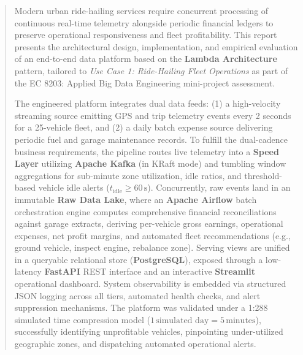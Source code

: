 \documentclass[11pt,a4paper]{article}
\begin{document}
\setcounter{page}{2}

\begin{abstract}
\noindent Modern urban ride-hailing services require concurrent processing of continuous real-time telemetry alongside periodic financial ledgers to preserve operational responsiveness and fleet profitability. This report presents the architectural design, implementation, and empirical evaluation of an end-to-end data platform based on the \textbf{Lambda Architecture} pattern, tailored to \textit{Use Case 1: Ride-Hailing Fleet Operations} as part of the EC 8203: Applied Big Data Engineering mini-project assessment.

The engineered platform integrates dual data feeds: (1) a high-velocity streaming source emitting GPS and trip telemetry events every 2 seconds for a 25-vehicle fleet, and (2) a daily batch expense source delivering periodic fuel and garage maintenance records. To fulfill the dual-cadence business requirements, the pipeline routes live telemetry into a \textbf{Speed Layer} utilizing \textbf{Apache Kafka} (in KRaft mode) and tumbling window aggregations for sub-minute zone utilization, idle ratios, and threshold-based vehicle idle alerts ($t_{\text{idle}} \ge 60\,\text{s}$). Concurrently, raw events land in an immutable \textbf{Raw Data Lake}, where an \textbf{Apache Airflow} batch orchestration engine computes comprehensive financial reconciliations against garage extracts, deriving per-vehicle gross earnings, operational expenses, net profit margins, and automated fleet recommendations (e.g., ground vehicle, inspect engine, rebalance zone). Serving views are unified in a queryable relational store (\textbf{PostgreSQL}), exposed through a low-latency \textbf{FastAPI} REST interface and an interactive \textbf{Streamlit} operational dashboard. System observability is embedded via structured JSON logging across all tiers, automated health checks, and alert suppression mechanisms. The platform was validated under a 1:288 simulated time compression model ($1\,\text{simulated day} = 5\,\text{minutes}$), successfully identifying unprofitable vehicles, pinpointing under-utilized geographic zones, and dispatching automated operational alerts.

\vspace{0.4cm}
\end{abstract}
\end{document}
